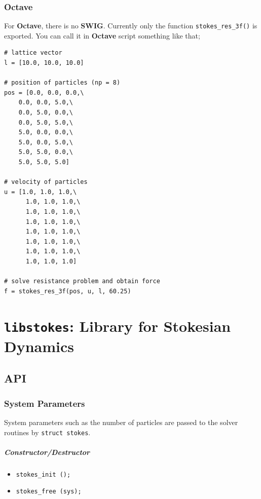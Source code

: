 \documentclass{book}
\begin{document}
\subsection{Octave}
For {\bf Octave}\cite{Octave}, there is no {\bf SWIG}\cite{SWIG}.
Currently only the function {\tt stokes\_res\_3f()} is exported.
You can call it in {\bf Octave} script something like that;
{\small
\begin{verbatim}
# lattice vector
l = [10.0, 10.0, 10.0]

# position of particles (np = 8)
pos = [0.0, 0.0, 0.0,\
	0.0, 0.0, 5.0,\
	0.0, 5.0, 0.0,\
	0.0, 5.0, 5.0,\
	5.0, 0.0, 0.0,\
	5.0, 0.0, 5.0,\
	5.0, 5.0, 0.0,\
	5.0, 5.0, 5.0]

# velocity of particles
u = [1.0, 1.0, 1.0,\
      1.0, 1.0, 1.0,\
      1.0, 1.0, 1.0,\
      1.0, 1.0, 1.0,\
      1.0, 1.0, 1.0,\
      1.0, 1.0, 1.0,\
      1.0, 1.0, 1.0,\
      1.0, 1.0, 1.0]

# solve resistance problem and obtain force
f = stokes_res_3f(pos, u, l, 60.25)
\end{verbatim}
}



\chapter{{\tt libstokes}:
  Library for Stokesian Dynamics}
\label{chp:libstokes}
\section{API}

\subsection{System Parameters}
System parameters such as the number of particles
are passed to the solver routines by {\tt struct stokes}.

\paragraph{Constructor/Destructor}
\begin{itemize}
\item {\tt stokes\_init ();}
\item {\tt stokes\_free (sys);}
\end{itemize}
\end{document}
